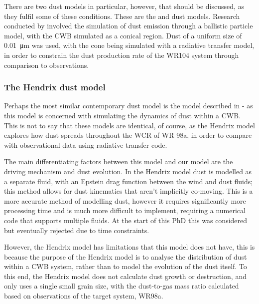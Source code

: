 \noindent
There are two dust models in particular, however, that should be discussed, as they fulfil some of these conditions.
These are the \textcite{harriesThreedimensionalDustRadiativetransfer2004} and \textcite{hendrix_pinwheels_2016} dust models.
Research conducted by \textcite{harriesThreedimensionalDustRadiativetransfer2004} involved the simulation of dust emission through a ballistic particle model, with the CWB simulated as a conical region.
Dust of a uniform size of \SI{0.01}{\micro\metre} was used, with the cone being simulated with a radiative transfer model, in order to constrain the dust production rate of the WR104 system through comparison to observations.

\subsubsection{The Hendrix dust model}
\label{sec:hendrixmodel}

Perhaps the most similar contemporary dust model is the model described in \textcite{hendrix_pinwheels_2016} - as this model is concerned with simulating the dynamics of dust within a CWB.
This is not to say that these models are identical, of course, as the Hendrix model explores how dust spreads throughout the WCR of WR 98a, in order to compare with observational data using radiative transfer code.


The main differentiating factors between this model and our model are the driving mechanism and dust evolution.
In the Hendrix model dust is modelled as a separate fluid, with an Epstein drag function between the wind and dust fluids; this method allows for dust kinematics that aren't implicitly co-moving.
This is a more accurate method of modelling dust, however it requires significantly more processing time and is much more difficult to implement, requiring a numerical code that supports multiple fluids.
At the start of this PhD this was considered but eventually rejected due to time constraints.

However, the Hendrix model has limitations that this model does not have, this is because the purpose of the Hendrix model is to analyse the distribution of dust within a CWB system, rather than to model the evolution of the dust itself.
To this end, the Hendrix model does not calculate dust growth or destruction, and only uses a single small grain size, with the dust-to-gas mass ratio calculated based on observations of the target system, WR98a.

